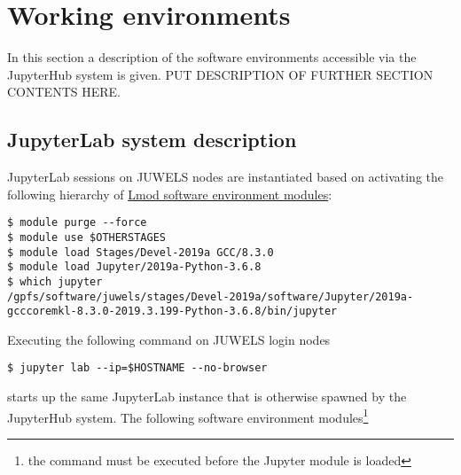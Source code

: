 
\section{Working environments}
\label{sect:working-envs}

In this section a description of the software environments accessible via the JupyterHub system is given.
PUT DESCRIPTION OF FURTHER SECTION CONTENTS HERE.

\subsection{JupyterLab system description}
\label{sect:system-description}

JupyterLab sessions on JUWELS nodes are instantiated based on activating the following hierarchy of \href{https://lmod.readthedocs.io/en/latest/index.html}{Lmod software environment modules}:
%
\begin{verbatim}
$ module purge --force
$ module use $OTHERSTAGES
$ module load Stages/Devel-2019a GCC/8.3.0
$ module load Jupyter/2019a-Python-3.6.8
$ which jupyter
/gpfs/software/juwels/stages/Devel-2019a/software/Jupyter/2019a-gcccoremkl-8.3.0-2019.3.199-Python-3.6.8/bin/jupyter
\end{verbatim}

Executing the following command on JUWELS login nodes
%
\begin{verbatim}
$ jupyter lab --ip=$HOSTNAME --no-browser
\end{verbatim}
%
starts up the same JupyterLab instance that is otherwise spawned by the JupyterHub system.
The following software environment modules\footnote{the command must be executed before the Jupyter module is loaded}

